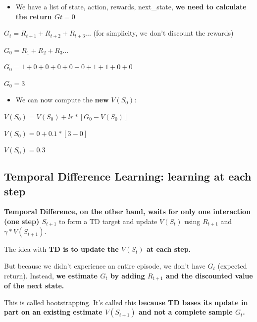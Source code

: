 \documentclass[11pt,a4paper]{article}
\begin{document}
\begin{itemize}
\tightlist
\item
  We have a list of state, action, rewards, next\_state, \textbf{we need to calculate the return \(G{t=0}\)}
\end{itemize}

\(G_t = R_{t+1} + R_{t+2} + R_{t+3} ...\) (for simplicity, we don't discount the rewards)

\(G_0 = R_{1} + R_{2} + R_{3}\ldots\)

\(G_0 = 1 + 0 + 0 + 0 + 0 + 0 + 1 + 1 + 0 + 0\)

\(G_0 = 3\)

\begin{itemize}
\tightlist
\item
  We can now compute the \textbf{new} \(V(S_0)\):
\end{itemize}


\(V(S_0) = V(S_0) + lr * [G_0 - V(S_0)]\)

\(V(S_0) = 0 + 0.1 * [3 - 0]\)

\(V(S_0) = 0.3\)


\subsection{Temporal Difference Learning: learning at each step}\label{temporal-difference-learning-learning-at-each-step}

\textbf{Temporal Difference, on the other hand, waits for only one interaction (one step) \(S_{t+1}\)} to form a TD target and update \(V(S_t)\) using \(R_{t+1}\) and \(\gamma * V(S_{t+1})\).

The idea with \textbf{TD is to update the \(V(S_t)\) at each step.}

But because we didn't experience an entire episode, we don't have \(G_t\) (expected return). Instead, \textbf{we estimate \(G_t\) by adding \(R_{t+1}\) and the discounted value of the next state.}

This is called bootstrapping. It's called this \textbf{because TD bases its update in part on an existing estimate \(V(S_{t+1})\) and not a complete sample \(G_t\).}
\end{document}
